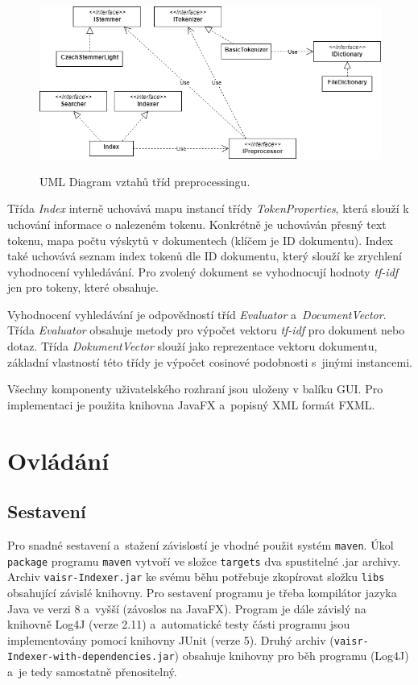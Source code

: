 \documentclass[12pt, a4paper]{article}
\begin{document}
\begin{figure}[h!]
\centering
\includegraphics[bb= 0 0 686 306 , width=120mm]{UML-preprocess.png}
\label{fig:preprocessUML}
\caption{UML Diagram vztahů tříd preprocessingu.}
\end{figure}

Třída \emph{Index} interně uchovává mapu instancí třídy \emph{TokenProperties}, která slouží k uchování informace o nalezeném tokenu. Konkrétně je uchováván přesný text tokenu, mapa počtu výskytů v dokumentech (klíčem je ID dokumentu). Index také uchovává seznam index tokenů dle ID dokumentu, který slouží ke zrychlení vyhodnocení vyhledávání. Pro zvolený dokument se vyhodnocují hodnoty \emph{tf-idf} jen pro tokeny, které obsahuje.

Vyhodnocení vyhledávání je odpovědností tříd \emph{Evaluator} a~\emph{DocumentVector}. Třída \emph{Evaluator} obsahuje metody pro výpočet vektoru \emph{tf-idf} pro dokument nebo dotaz. Třída \emph{DokumentVector} slouží jako reprezentace vektoru dokumentu, základní vlastností této třídy je výpočet cosinové podobnosti s~jinými instancemi.    

Všechny komponenty uživatelského rozhraní jsou uloženy v balíku GUI. Pro implementaci je použita knihovna JavaFX a~popisný XML formát FXML. 

\section{Ovládání}

\subsection{Sestavení}

Pro snadné sestavení a~stažení závislostí je vhodné použit systém \texttt{maven}. Úkol \texttt{package} programu \texttt{maven} vytvoří ve složce \texttt{targets} dva spustitelné .jar archivy. Archiv \texttt{vaisr-Indexer.jar} ke svému běhu potřebuje zkopírovat složku \texttt{libs} obsahující závislé knihovny. Pro sestavení programu je třeba kompilátor jazyka Java ve verzi 8 a~vyšší (závoslos na JavaFX). Program je dále závislý na knihovně Log4J (verze 2.11) a~automatické testy části programu jsou implementovány pomocí knihovny JUnit (verze 5). Druhý archiv (\texttt{vaisr-Indexer-with-dependencies.jar}) obsahuje knihovny pro běh programu (Log4J) a~je tedy samostatně přenositelný.
\end{document}
